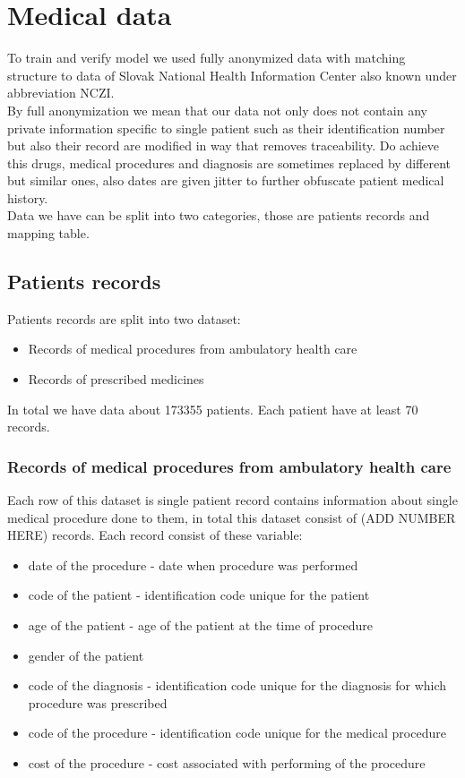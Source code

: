 
\chapter{Medical data} \label{chap:data}

To train and verify model we used fully anonymized data with matching structure to data of Slovak National Health Information Center also known under abbreviation NCZI. 
\\

By full anonymization we mean that our data not only does not contain any private information specific to single patient such as their identification number but also their record are modified in way that removes traceability. Do achieve this drugs, medical procedures and diagnosis are sometimes replaced by different but similar ones, also dates are given jitter to further obfuscate patient medical history.
\\  

Data we have can be split into two categories, those are patients records and mapping table. 

\section{Patients records}

Patients records are split into two dataset:
\begin{itemize}
	\item Records of medical procedures from ambulatory health care
	\item Records of prescribed medicines
\end{itemize}

In total we have data about 173355 patients. Each patient have at least 70 records.

\subsection{Records of medical procedures from ambulatory health care}

Each row of this dataset is single patient record contains information about single medical procedure done to them, in total this dataset consist of (ADD NUMBER HERE) records. Each record consist of these variable:
\begin{itemize}
	\item date of the procedure - date when procedure was performed
	\item code of the patient - identification code unique for the patient
	\item age of the patient - age of the patient at the time of procedure
	\item gender of the patient
	\item code of the diagnosis - identification code unique for the diagnosis for which procedure was prescribed
	\item code of the procedure - identification code unique for the medical procedure 
	\item cost of the procedure - cost associated with performing of the procedure
\end{itemize}

